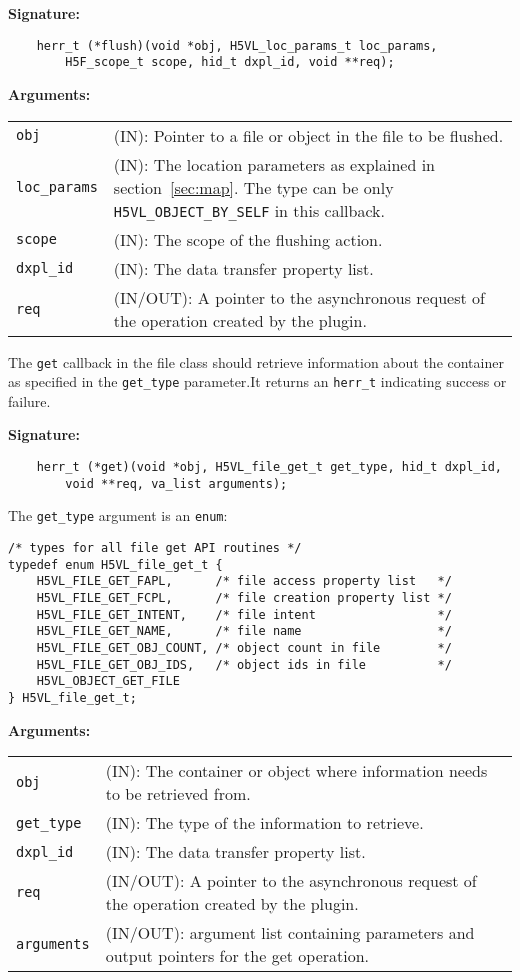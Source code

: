 \textbf{Signature:}
\begin{lstlisting}
    herr_t (*flush)(void *obj, H5VL_loc_params_t loc_params, 
        H5F_scope_t scope, hid_t dxpl_id, void **req);
\end{lstlisting}

\textbf{Arguments:}\\
\begin{tabular}{l p{10cm}}
  {\tt obj} & (IN): Pointer to a file or object in the file to be flushed.\\
  {\tt loc\_params} & (IN): The location parameters as explained in
  section~\ref{sec:map}. The type can be only {\tt
    H5VL\_OBJECT\_BY\_SELF} in this callback. \\
  {\tt scope} & (IN): The scope of the flushing action.\\
  {\tt dxpl\_id} & (IN): The data transfer property list.\\
  {\tt req} & (IN/OUT): A pointer to the asynchronous request of the
  operation created by the plugin.\\
\end{tabular}

The {\tt get} callback in the file class should retrieve
information about the container as specified in the {\tt get\_type}
parameter.It returns an {\tt herr\_t} indicating success or failure.

\textbf{Signature:}
\begin{lstlisting}
    herr_t (*get)(void *obj, H5VL_file_get_t get_type, hid_t dxpl_id, 
        void **req, va_list arguments);
\end{lstlisting}

The {\tt get\_type} argument is an {\tt enum}:
\begin{lstlisting}
/* types for all file get API routines */
typedef enum H5VL_file_get_t {
    H5VL_FILE_GET_FAPL,      /* file access property list   */
    H5VL_FILE_GET_FCPL,      /* file creation property list */
    H5VL_FILE_GET_INTENT,    /* file intent                 */
    H5VL_FILE_GET_NAME,      /* file name                   */
    H5VL_FILE_GET_OBJ_COUNT, /* object count in file        */
    H5VL_FILE_GET_OBJ_IDS,   /* object ids in file          */
    H5VL_OBJECT_GET_FILE
} H5VL_file_get_t;
\end{lstlisting}

\textbf{Arguments:}\\
\begin{tabular}{l p{10cm}}
  {\tt obj} & (IN): The container or object where information needs to be
  retrieved from.\\
  {\tt get\_type} & (IN): The type of the information to retrieve.\\
  {\tt dxpl\_id} & (IN): The data transfer property list.\\
  {\tt req} & (IN/OUT): A pointer to the asynchronous request of the
  operation created by the plugin.\\
  {\tt arguments} & (IN/OUT): argument list containing parameters and
  output pointers for the get operation. \\
\end{tabular}

